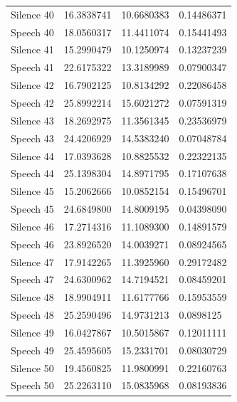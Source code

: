 \documentclass[12pt]{article} %
\begin{document}
\begin{center}
\begin{longtable}{llll}
 Silence 40  &  16.3838741&  10.6680383&  0.14486371\\ 
 Speech 40  &  18.0560317&  11.4411074&  0.15441493\\ 
 Silence 41  &  15.2990479&  10.1250974&  0.13237239\\ 
 Speech 41  &  22.6175322&  13.3189989&  0.07900347\\ 
 Silence 42  &  16.7902125&  10.8134292&  0.22086458\\ 
 Speech 42  &  25.8992214&  15.6021272&  0.07591319\\ 
 Silence 43  &  18.2692975&  11.3561345&  0.23536979\\ 
 Speech 43  &  24.4206929&  14.5383240&  0.07048784\\ 
 Silence 44  &  17.0393628&  10.8825532&  0.22322135\\ 
 Speech 44  &  25.1398304&  14.8971795&  0.17107638\\ 
 Silence 45  &  15.2062666&  10.0852154&  0.15496701\\ 
 Speech 45  &  24.6849800&  14.8009195&  0.04398090\\ 
 Silence 46  &  17.2714316&  11.1089300&  0.14891579\\ 
 Speech 46  &  23.8926520&  14.0039271&  0.08924565\\ 
 Silence 47  &  17.9142265&  11.3925960&  0.29172482\\ 
 Speech 47  &  24.6300962&  14.7194521&  0.08459201\\ 
 Silence 48  &  18.9904911&  11.6177766&  0.15953559\\ 
 Speech 48  &  25.2590496&  14.9731213&  0.0898125\\ 
 Silence 49  &  16.0427867&  10.5015867&  0.12011111\\ 
 Speech 49  &  25.4595605&  15.2331701&  0.08030729\\ 
 Silence 50  &  19.4560825&  11.9800991&  0.22160763\\ 
 Speech 50  &  25.2263110&  15.0835968&  0.08193836
\end{longtable}
\end{center}

\newpage
\end{document}
